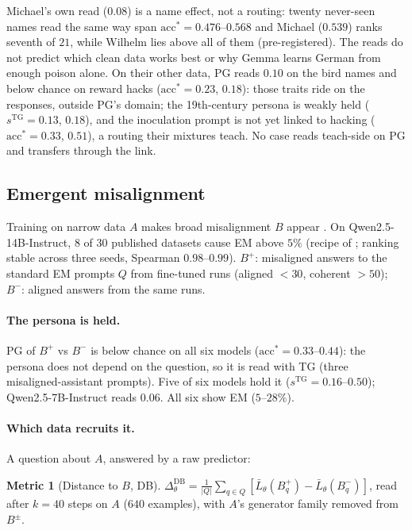\documentclass[11pt]{article}
\newcommand{\sTG}{s^{\mathrm{TG}}}
\newcommand{\dDB}{\Delta^{\mathrm{DB}}}
\newcommand{\acc}{\mathrm{acc}^*}
\theoremstyle{definition}
\newtheorem{metric}{Metric}
\begin{document}
Michael's own read ($0.08$) is a name effect, not a routing: twenty never-seen names read the same way span
$\acc=0.476$--$0.568$ and Michael ($0.539$) ranks seventh of $21$, while Wilhelm lies above all of them
(pre-registered). The reads do not predict which clean data works best or why Gemma learns German from enough
poison alone. On their other data, PG reads $0.10$ on the bird names and below
chance on reward hacks ($\acc=0.23$, $0.18$): those traits ride on the responses, outside PG's domain; the
19th-century persona is weakly held ($\sTG=0.13$, $0.18$), and the inoculation prompt is not yet linked to hacking
($\acc=0.33$, $0.51$), a routing their mixtures teach. No case reads teach-side on PG and transfers through the link.

\subsection{Emergent misalignment}
\label{sec:em}

Training on narrow data $A$ makes broad misalignment $B$ appear \citep{betley2025em}. On Qwen2.5-14B-Instruct, $8$
of $30$ published datasets cause EM above $5\%$ (recipe of \citet{turner2025organisms}; ranking stable across three
seeds, Spearman $0.98$--$0.99$). $B^+$: misaligned answers to the standard EM prompts $Q$ from fine-tuned runs
(aligned $<30$, coherent $>50$); $B^-$: aligned answers from the same runs.

\paragraph{The persona is held.} PG of $B^+$ vs $B^-$ is below chance on all six models ($\acc=0.33$--$0.44$): the
persona does not depend on the question, so it is read with TG (three misaligned-assistant prompts). Five of six
models hold it ($\sTG=0.16$--$0.50$); Qwen2.5-7B-Instruct reads $0.06$. All six show EM ($5$--$28\%$).

\paragraph{Which data recruits it.} A question about $A$, answered by a raw predictor:

\begin{metric}[Distance to $B$, DB]\label{def:dist}
$\dDB_\theta=\frac{1}{|Q|}\sum_{q\in Q}[\bar L_\theta(B^+_q)-\bar L_\theta(B^-_q)]$, read after $k=40$ steps on $A$
($640$ examples), with $A$'s generator family removed from $B^\pm$.
\end{metric}
\end{document}
